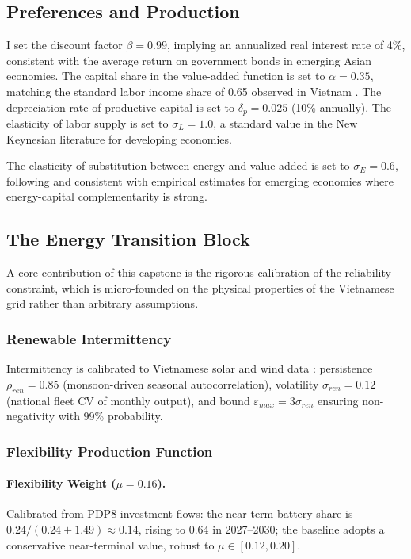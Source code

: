 	\subsection{Preferences and Production}
	I set the discount factor $\beta = 0.99$, implying an annualized real interest rate of 4\%, consistent with the average return on government bonds in emerging Asian economies. The capital share in the value-added function is set to $\alpha = 0.35$, matching the standard labor income share of 0.65 observed in Vietnam \citep{gso2024}. The depreciation rate of productive capital is set to $\delta_p = 0.025$ (10\% annually). The elasticity of labor supply is set to $\sigma_L = 1.0$, a standard value in the New Keynesian literature for developing economies.
	
	The elasticity of substitution between energy and value-added is set to $\sigma_E = 0.6$, following \citet{heutel2012} and consistent with empirical estimates for emerging economies where energy-capital complementarity is strong.
	
	\subsection{The Energy Transition Block}
	
	A core contribution of this capstone is the rigorous calibration of the reliability constraint, which is micro-founded on the physical properties of the Vietnamese grid rather than arbitrary assumptions.
	
	\subsubsection{Renewable Intermittency}
	
	Intermittency is calibrated to Vietnamese solar and wind data \citep{iea2023, gso2024}: persistence $\rho_{ren} = 0.85$ (monsoon-driven seasonal autocorrelation), volatility $\sigma_{ren} = 0.12$ (national fleet CV of monthly output), and bound $\varepsilon_{max} = 3\sigma_{ren}$ ensuring non-negativity with 99\% probability.

	\subsubsection{Flexibility Production Function}

	\paragraph{Flexibility Weight ($\mu = 0.16$).}
	Calibrated from PDP8 investment flows: the near-term battery share is $0.24/(0.24+1.49)\approx 0.14$, rising to $0.64$ in 2027--2030; the baseline adopts a conservative near-terminal value, robust to $\mu\in[0.12,0.20]$.

